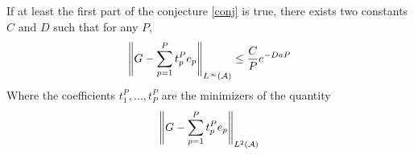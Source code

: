 \documentclass[11pt,a4paper]{article}
\begin{document}
\begin{Prop}  If at least the first part of the conjecture \ref{conj} is true, there exists two constants $C$ and $D$ such that for any $P$, 
\[ \left\|G - \sum_{p=1}^P t_p^P e_p\right\|_{L^{\infty}(\mathcal{A})} \leq \dfrac{C}{P}e^{-DaP}\]
Where the coefficients $t_1^P,...,t_P^P$ are the minimizers of the quantity 
\[ \left\|G - \sum_{p=1}^P t_p^P e_p\right\|_{L^{2}(\mathcal{A})} \]

\end{Prop}



 
\end{document}
